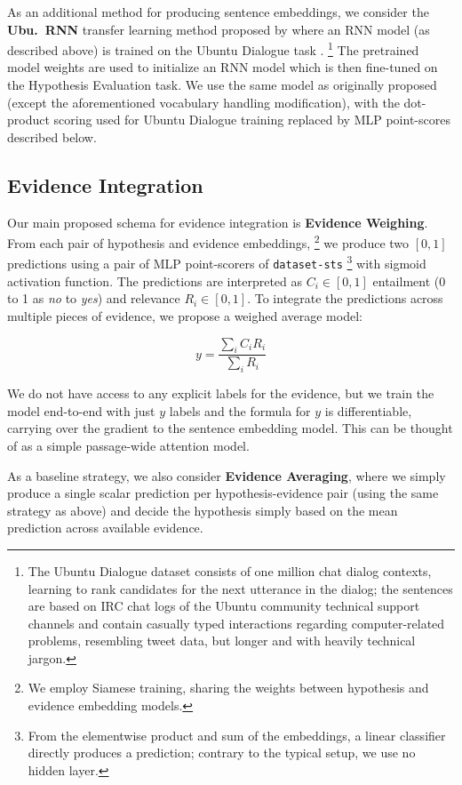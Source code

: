 \documentclass[11pt]{article}
\begin{document}
As an additional method for producing sentence embeddings, we consider
the \textbf{Ubu.\ RNN} transfer learning method proposed by \cite{sps} where an RNN model
(as described above) is trained on the Ubuntu Dialogue task \cite{UbuntuLowe}.%
\footnote{The Ubuntu Dialogue dataset consists of one million chat dialog contexts,
learning to rank candidates for the next utterance in the dialog;
the sentences are based on IRC chat logs of the Ubuntu
community technical support channels and contain casually typed interactions regarding
computer-related problems, resembling tweet data, but longer and with heavily technical jargon.}
The pretrained model weights are used to initialize an RNN model which is then fine-tuned
on the Hypothesis Evaluation task.  We use the same model as originally proposed (except the aforementioned vocabulary handling modification),
with the dot-product scoring used for Ubuntu Dialogue training replaced by MLP point-scores described below.

\subsection{Evidence Integration}

Our main proposed schema for evidence integration is \textbf{Evidence Weighing}.
From each pair of hypothesis and evidence embeddings,%
\footnote{We employ Siamese training, sharing the weights between hypothesis and evidence embedding models.}
we produce two $[0,1]$
predictions using a pair of MLP point-scorers of \texttt{dataset-sts} \cite{sps}%
\footnote{From the elementwise product
and sum of the embeddings, a linear classifier directly produces a prediction;
contrary to the typical setup, we use no hidden layer.}
with sigmoid activation function.  The predictions are interpreted as $C_i \in [0,1]$
entailment (0 to 1 as \textit{no} to \textit{yes}) and relevance $R_i \in [0,1]$.
To integrate the predictions across multiple pieces of evidence,
we propose a weighed average model:

$$ y  = \frac{\sum_i C_iR_i}{\sum_i R_i} $$

We do not have access to any explicit labels for the evidence,
but we train the model end-to-end with just $y$ labels and the formula
for $y$ is differentiable, carrying over the gradient to the sentence
embedding model.
This can be thought of as a simple passage-wide attention model.

As a baseline strategy, we also consider \textbf{Evidence Averaging}, where
we simply produce a single scalar prediction per hypothesis-evidence pair
(using the same strategy as above) and decide the hypothesis simply based
on the mean prediction across available evidence.
\end{document}
